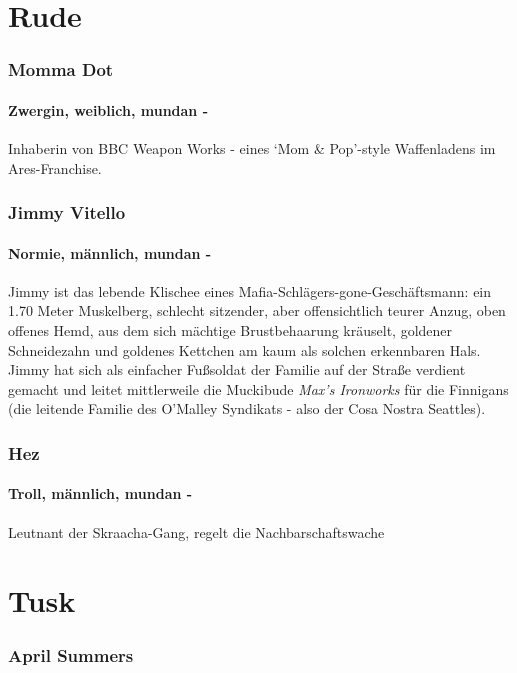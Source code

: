  
\section{Rude}
 
    \subsubsection{Momma Dot}
    \paragraph{Zwergin, weiblich, mundan -} Inhaberin von BBC Weapon Works - eines ‘Mom \& Pop’-style Waffenladens im Ares-Franchise. 
    
    \subsubsection{Jimmy Vitello}
    \paragraph{Normie, männlich, mundan -} Jimmy ist das lebende Klischee eines Mafia-Schlägers-gone-Geschäftsmann: ein 1.70 Meter Muskelberg, schlecht sitzender, aber offensichtlich teurer Anzug, oben offenes Hemd, aus dem sich mächtige Brustbehaarung kräuselt, goldener Schneidezahn und goldenes Kettchen am kaum als solchen erkennbaren Hals.
    Jimmy hat sich als einfacher Fußsoldat der Familie auf der Straße verdient gemacht und leitet mittlerweile die Muckibude \textit{Max's Ironworks} für die Finnigans (die leitende Familie des O'Malley Syndikats - also der Cosa Nostra Seattles).
    
    \subsubsection{Hez}
    \paragraph{Troll, männlich, mundan -} Leutnant der Skraacha-Gang, regelt die Nachbarschaftswache

 
\section{Tusk}

    \subsubsection{April Summers}
